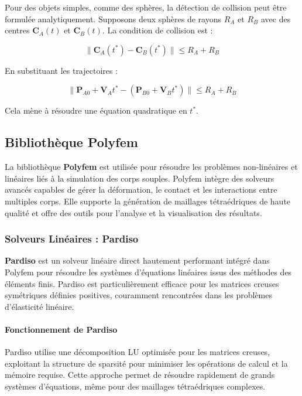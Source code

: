 Pour des objets simples, comme des sphères, la détection de collision peut être formulée analytiquement. Supposons deux sphères de rayons \( R_A \) et \( R_B \) avec des centres \( \mathbf{C}_A(t) \) et \( \mathbf{C}_B(t) \). La condition de collision est :

\[
\|\mathbf{C}_A(t^*) - \mathbf{C}_B(t^*)\| \leq R_A + R_B
\]

En substituant les trajectoires :

\[
\|\mathbf{P}_{A0} + \mathbf{V}_A t^* - (\mathbf{P}_{B0} + \mathbf{V}_B t^*)\| \leq R_A + R_B
\]

Cela mène à résoudre une équation quadratique en \( t^* \).

\subsection{Bibliothèque Polyfem}

La bibliothèque \textbf{Polyfem} est utilisée pour résoudre les problèmes non-linéaires et linéaires liés à la simulation des corps souples. Polyfem intègre des solveurs avancés capables de gérer la déformation, le contact et les interactions entre multiples corps. Elle supporte la génération de maillages tétraédriques de haute qualité et offre des outils pour l'analyse et la visualisation des résultats.

\subsubsection{Solveurs Linéaires : Pardiso}

\textbf{Pardiso} est un solveur linéaire direct hautement performant intégré dans Polyfem pour résoudre les systèmes d'équations linéaires issus des méthodes des éléments finis. Pardiso est particulièrement efficace pour les matrices creuses symétriques définies positives, couramment rencontrées dans les problèmes d'élasticité linéaire.

\paragraph{Fonctionnement de Pardiso}

Pardiso utilise une décomposition LU optimisée pour les matrices creuses, exploitant la structure de sparsité pour minimiser les opérations de calcul et la mémoire requise. Cette approche permet de résoudre rapidement de grands systèmes d'équations, même pour des maillages tétraédriques complexes.

